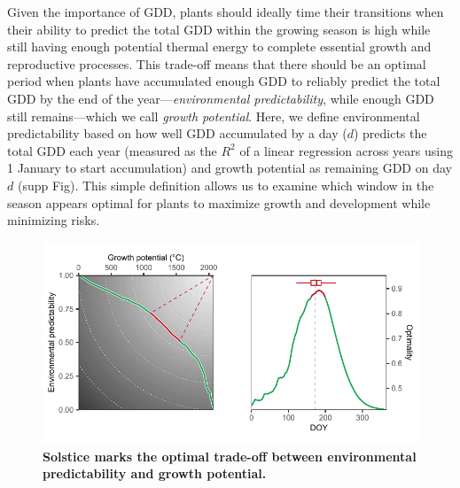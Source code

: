 \documentclass[11pt,letter]{article}
\begin{document}
Given the importance of GDD, plants should ideally time their transitions when their ability to predict the total GDD within the growing season is high while still having enough potential thermal energy to complete essential growth and reproductive processes. This trade-off means that there should be an optimal period when plants have accumulated enough GDD to reliably predict the total GDD by the end of the year---\emph{environmental predictability}, while enough GDD still remains---which we call \emph{growth potential}. Here, we define environmental predictability based on how well GDD accumulated by a day ($d$) predicts the total GDD each year (measured as the $R^2$ of a linear regression across years using 1 January to start accumulation) and growth potential as remaining GDD on day $d$ (supp Fig). %
This simple definition allows us to examine which window in the season appears optimal for plants to maximize growth and development while minimizing risks. %

\begin{figure}[h]
\centering
\includegraphics{global_optimality.pdf}
\vspace*{-0.7cm}
\caption{\textbf{Solstice marks the optimal trade-off between environmental predictability and growth potential.}} %
\label{fig:globaloptimality}
\end{figure}
\end{document}

